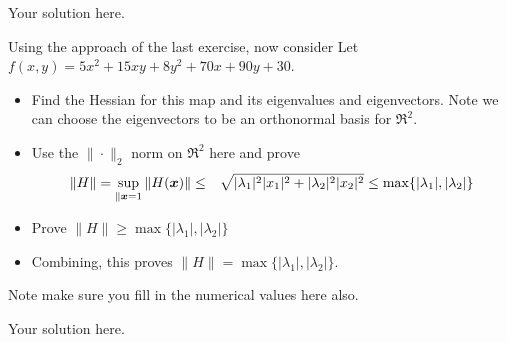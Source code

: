 \documentclass[11pt]{SelfArxOneColBMN}
\begin{document}
\begin{solution}
Your solution here.
\end{solution}

\begin{exercise}
Using the approach of the last exercise, now consider
Let $f(x,y) = 5x^2 + 15xy + 8y^2 + 70x + 90y + 30$.
\begin{itemize}
\item Find the Hessian for this map and its eigenvalues and eigenvectors.
Note we can choose the eigenvectors to be an orthonormal basis for $\Re^2$.
\item Use the $\| \cdot\|_2$ norm on $\Re^2$ here and prove
\begin{eqnarray*}
\|H\| = \sup_{\|\boldsymbol{x} = 1} \|H(\boldsymbol{x})\| & \leq & \sqrt{|\lambda_1|^2 |x_1|^2 + |\lambda_2|^2 |x_2|^2}
\leq \max\{ |\lambda_1|,|\lambda_2|\}
\end{eqnarray*}
\item Prove $\|H\|  \geq \max\{ |\lambda_1|,|\lambda_2|\}$
\item Combining, this proves $\|H\|  = \max\{ |\lambda_1|,|\lambda_2|\}$.
\end{itemize}
\noindent
Note make sure you fill in the numerical values here also.
\end{exercise}

\begin{solution}
Your solution here.
\end{solution}
\end{document}
